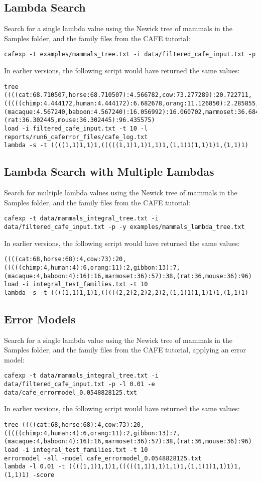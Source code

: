 \documentclass{article}
\begin{document}
\subsection{Lambda Search}
Search for a single lambda value using the Newick tree of mammals in the Samples folder, and the family files from the CAFE tutorial:
\begin{lstlisting}
cafexp -t examples/mammals_tree.txt -i data/filtered_cafe_input.txt -p
\end{lstlisting}
In earlier versions, the following script would have returned the same values:
\begin{lstlisting}
tree ((((cat:68.710507,horse:68.710507):4.566782,cow:73.277289):20.722711,(((((chimp:4.444172,human:4.444172):6.682678,orang:11.126850):2.285855,gibbon:13.412706):7.211527,(macaque:4.567240,baboon:4.567240):16.056992):16.060702,marmoset:36.684935):57.315065):38.738021,(rat:36.302445,mouse:36.302445):96.435575)
load -i filtered_cafe_input.txt -t 10 -l reports/run6_caferror_files/cafe_log.txt
lambda -s -t ((((1,1)1,1)1,(((((1,1)1,1)1,1)1,(1,1)1)1,1)1)1,(1,1)1)
\end{lstlisting}
\subsection{Lambda Search with Multiple Lambdas}
Search for multiple lambda values using the Newick tree of mammals in the Samples folder, and the family files from the CAFE tutorial:
\begin{lstlisting}
cafexp -t data/mammals_integral_tree.txt -i data/filtered_cafe_input.txt -p -y examples/mammals_lambda_tree.txt
\end{lstlisting}
In earlier versions, the following script would have returned the same values:
\begin{lstlisting}
((((cat:68,horse:68):4,cow:73):20,(((((chimp:4,human:4):6,orang:11):2,gibbon:13):7,(macaque:4,baboon:4):16):16,marmoset:36):57):38,(rat:36,mouse:36):96) 
load -i integral_test_families.txt -t 10
lambda -s -t ((((1,1)1,1)1,(((((2,2)2,2)2,2)2,(1,1)1)1,1)1)1,(1,1)1)
\end{lstlisting}
\subsection{Error Models}
Search for a single lambda value using the Newick tree of mammals in the Samples folder, and the family files from the CAFE tutorial, applying an error model:
\begin{lstlisting}
cafexp -t data/mammals_integral_tree.txt -i data/filtered_cafe_input.txt -p -l 0.01 -e data/cafe_errormodel_0.0548828125.txt
\end{lstlisting}
In earlier versions, the following script would have returned the same values:
\begin{lstlisting}
tree ((((cat:68,horse:68):4,cow:73):20,(((((chimp:4,human:4):6,orang:11):2,gibbon:13):7,(macaque:4,baboon:4):16):16,marmoset:36):57):38,(rat:36,mouse:36):96) load -i integral_test_families.txt -t 10
errormodel -all -model cafe_errormodel_0.0548828125.txt
lambda -l 0.01 -t ((((1,1)1,1)1,(((((1,1)1,1)1,1)1,(1,1)1)1,1)1)1,(1,1)1) -score
\end{lstlisting}
\end{document}
